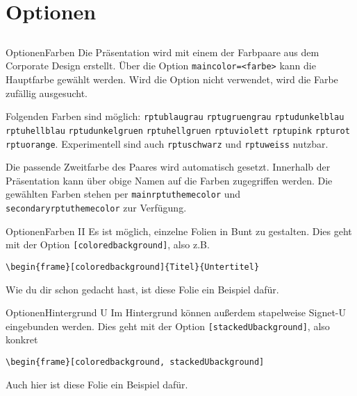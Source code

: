 \documentclass[german,10pt,xcolor=colortbl,compress
]{beamer}
\begin{document}
\section{Optionen}
\subsection*{}
\newcommand{\farbe}[1]{{\color{#1}\lstinline|#1|}}
\begin{frame}{Optionen}{Farben}
	Die Präsentation wird mit einem der Farbpaare aus dem Corporate Design erstellt. Über die Option \lstinline!maincolor=<farbe>! kann die Hauptfarbe gewählt werden. Wird die Option nicht verwendet, wird die Farbe zufällig ausgesucht. \par
	Folgenden Farben sind möglich:
	\farbe{rptublaugrau} \farbe{rptugruengrau} \farbe{rptudunkelblau} \farbe{rptuhellblau}
	\farbe{rptudunkelgruen} \farbe{rptuhellgruen} \farbe{rptuviolett} \farbe{rptupink}
	\farbe{rpturot} \farbe{rptuorange}. Experimentell sind auch \farbe{rptuschwarz} und \color{black}\lstinline!rptuweiss! nutzbar.\par
	Die passende Zweitfarbe des Paares wird automatisch gesetzt. Innerhalb der Präsentation kann über obige Namen auf die Farben zugegriffen werden. Die gewählten Farben stehen per \farbe{mainrptuthemecolor} und \farbe{secondaryrptuthemecolor} zur Verfügung. \par
\end{frame}
\begin{frame}{Optionen}{Farben II}
	Es ist möglich, einzelne Folien in Bunt zu gestalten. Dies geht mit der Option \lstinline![coloredbackground]!, also z.B.
	\begin{lstlisting}
\begin{frame}[coloredbackground]{Titel}{Untertitel}
\end{lstlisting}
	Wie du dir schon gedacht hast, ist diese Folie ein Beispiel dafür.
\end{frame}
\begin{frame}{Optionen}{Hintergrund U}
	Im Hintergrund können außerdem stapelweise Signet-U eingebunden werden. Dies geht mit der Option \lstinline![stackedUbackground]!, also konkret
	\begin{lstlisting}
\begin{frame}[coloredbackground, stackedUbackground]
\end{lstlisting}
	Auch hier ist diese Folie ein Beispiel dafür.
\end{frame}
\end{document}
